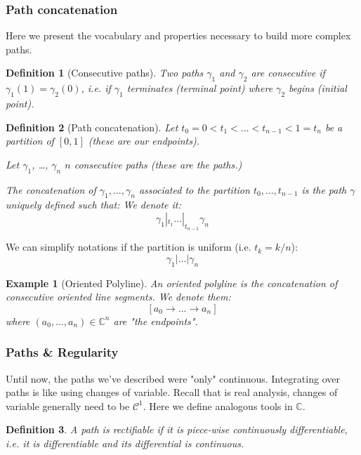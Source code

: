 \documentclass{article}
\newtheorem*{defi}{Definition}
\newtheorem*{example}{Example}
\begin{document}
\subsubsection{Path concatenation}

Here we present the vocabulary and properties necessary to build more complex paths.
\begin{defi}[Consecutive paths]
    Two paths $\gamma_1$ and $\gamma_2$ are consecutive if $\gamma_1(1) = \gamma_2(0)$, i.e. if $\gamma_1$ terminates (terminal point) where $\gamma_2$ begins (initial point).
\end{defi}

\begin{defi}[Path concatenation]
    Let $t_0=0 < t_1 < \dots < t_{n-1} < 1=t_n $ be a partition of $[0,1]$ (these are our endpoints).

    Let $\gamma_1$, \dots, $\gamma_n$ $n$ consecutive paths (these are the paths.)

    The concatenation of $\gamma_1, \dots, \gamma_n$ associated to the partition $t_0, \dots, t_{n-1}$ is the path $\gamma$ uniquely defined such that:
    We denote it:
    $$ \gamma_1 |_{t_1} \dots |_{t_{n-1}} \gamma_n$$
\end{defi}

We can simplify notations if the partition is uniform (i.e. $t_k = k/n$):
    $$ \gamma_1 | \dots | \gamma_n$$

\begin{example}[Oriented Polyline]
    An oriented polyline is the concatenation of consecutive oriented line segments. We denote them:
    $$[a_0 \rightarrow \dots \rightarrow a_n]$$
    where $(a_0, \dots, a_n)\in\mathbb{C}^n$ are "the endpoints".
\end{example}

\subsubsection{Paths \& Regularity}

Until now, the paths we've described were "only" continuous. Integrating over paths is like using changes of variable. Recall that is real analysis, changes of variable generally need to be $\mathcal{C}^1$. Here we define analogous tools in $\mathbb{C}$.

\begin{defi}
    A path is rectifiable if it is piece-wise continuously differentiable, i.e. it is differentiable and its differential is continuous.
\end{defi}
\end{document}

